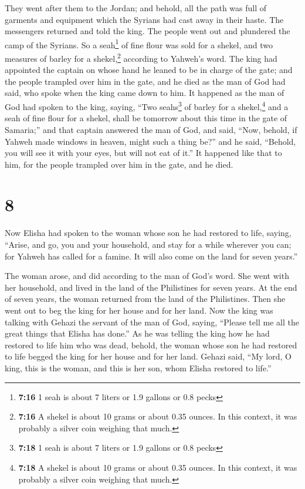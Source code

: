  They went after them to the Jordan; and behold, all the
path was full of garments and equipment which the Syrians had cast away
in their haste. The messengers returned and told the king.
 The people went out and plundered the camp of the
Syrians. So a seah\footnote{\textbf{7:16} 1 seah is about 7 liters or
  1.9 gallons or 0.8 pecks} of fine flour was sold for a shekel, and two
measures of barley for a shekel,\footnote{\textbf{7:16} A shekel is
  about 10 grams or about 0.35 ounces. In this context, it was probably
  a silver coin weighing that much.} according to Yahweh's word.
 The king had appointed the captain on whose hand he
leaned to be in charge of the gate; and the people trampled over him in
the gate, and he died as the man of God had said, who spoke when the
king came down to him.  It happened as the man of God had
spoken to the king, saying, ``Two seahs\footnote{\textbf{7:18} 1 seah is
  about 7 liters or 1.9 gallons or 0.8 pecks} of barley for a
shekel,\footnote{\textbf{7:18} A shekel is about 10 grams or about 0.35
  ounces. In this context, it was probably a silver coin weighing that
  much.} and a seah of fine flour for a shekel, shall be tomorrow about
this time in the gate of Samaria;''  and that captain
answered the man of God, and said, ``Now, behold, if Yahweh made windows
in heaven, might such a thing be?'' and he said, ``Behold, you will see
it with your eyes, but will not eat of it.''  It happened
like that to him, for the people trampled over him in the gate, and he
died.

\hypertarget{section-7}{%
\section{8}\label{section-7}}

 Now Elisha had spoken to the woman whose son he had
restored to life, saying, ``Arise, and go, you and your household, and
stay for a while wherever you can; for Yahweh has called for a famine.
It will also come on the land for seven years.''

 The woman arose, and did according to the man of God's
word. She went with her household, and lived in the land of the
Philistines for seven years.  At the end of seven years,
the woman returned from the land of the Philistines. Then she went out
to beg the king for her house and for her land.  Now the
king was talking with Gehazi the servant of the man of God, saying,
``Please tell me all the great things that Elisha has done.''
 As he was telling the king how he had restored to life
him who was dead, behold, the woman whose son he had restored to life
begged the king for her house and for her land. Gehazi said, ``My lord,
O king, this is the woman, and this is her son, whom Elisha restored to
life.''

